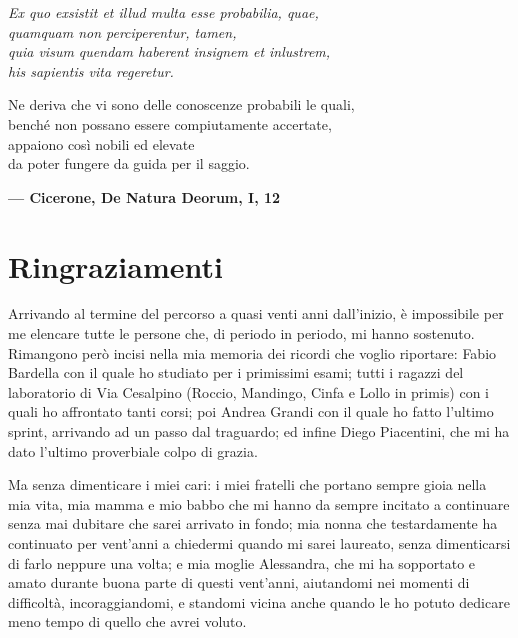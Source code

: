 
\begin{flushright}
{
	\emph{
		Ex quo exsistit et illud multa esse probabilia, quae, \\
		quamquam non perciperentur, tamen, \\
		quia visum quendam haberent insignem et inlustrem, \\
		his sapientis vita regeretur. \\
	}

	\medskip

	Ne deriva che vi sono delle conoscenze probabili le quali, \\
	benché non possano essere compiutamente accertate, \\
	appaiono così nobili ed elevate \\
	da poter fungere da guida per il saggio. \\

	\medskip

	\textbf{--- Cicerone, De Natura Deorum, I, 12} 
}
\end{flushright}

\bigskip

\begingroup
\let\clearpage\relax
\let\cleardoublepage\relax
\let\cleardoublepage\relax
\chapter*{Ringraziamenti}

Arrivando al termine del percorso a quasi venti anni dall'inizio, è
impossibile per me elencare tutte le persone che, di periodo in periodo, mi
hanno sostenuto. Rimangono però incisi nella mia memoria dei ricordi che
voglio riportare: Fabio Bardella con il quale ho studiato per i primissimi
esami; tutti i ragazzi del laboratorio di Via Cesalpino (Roccio, Mandingo,
Cinfa e Lollo in primis) con i quali ho affrontato tanti corsi; poi Andrea
Grandi con il quale ho fatto l'ultimo sprint, arrivando ad un passo dal
traguardo; ed infine Diego Piacentini, che mi ha dato l'ultimo proverbiale
colpo di grazia.

\bigskip

Ma senza dimenticare i miei cari: i miei fratelli che portano sempre gioia
nella mia vita, mia mamma e mio babbo che mi hanno da sempre incitato a
continuare senza mai dubitare che sarei arrivato in fondo; mia nonna che
testardamente ha continuato per vent'anni a chiedermi quando mi sarei
laureato, senza dimenticarsi di farlo neppure una volta; e mia moglie
Alessandra, che mi ha sopportato e amato durante buona parte di questi
vent'anni, aiutandomi nei momenti di difficoltà, incoraggiandomi, e standomi
vicina anche quando le ho potuto dedicare meno tempo di quello che avrei voluto.
\endgroup
